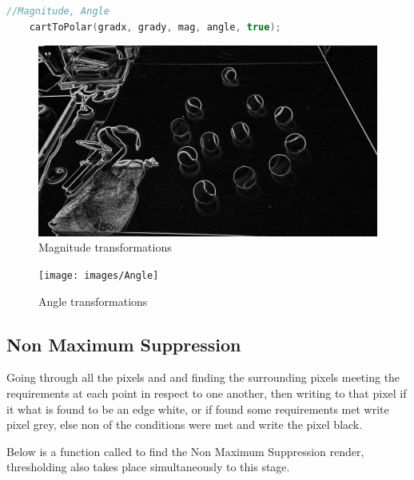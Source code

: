 \documentclass[a4paper, 10pt]{article}
\begin{document}
\begin{lstlisting}[language = C++]
	//Magnitude, Angle
	cartToPolar(gradx, grady, mag, angle, true);
\end{lstlisting}

\begin{figure}[H]
  \includegraphics[width=\linewidth]{images/Mag}
  \caption{Magnitude transformations}
  \label{fig:Magnitude transformations}
\end{figure}

\begin{figure}[H]
  \texttt{[image: images/Angle]}
  \caption{Angle transformations}
  \label{fig:Angle transformations}
\end{figure}



\subsection{Non Maximum Suppression}

Going through all the pixels and and finding the surrounding pixels meeting the requirements at each point in respect to one another, then writing to that pixel if it what is found to be an edge white, or if found some requirements met write pixel grey, else non of the conditions were met and write the pixel black.

Below is a function called to find the Non Maximum Suppression render, thresholding also takes place simultaneously to this stage.
\end{document}
